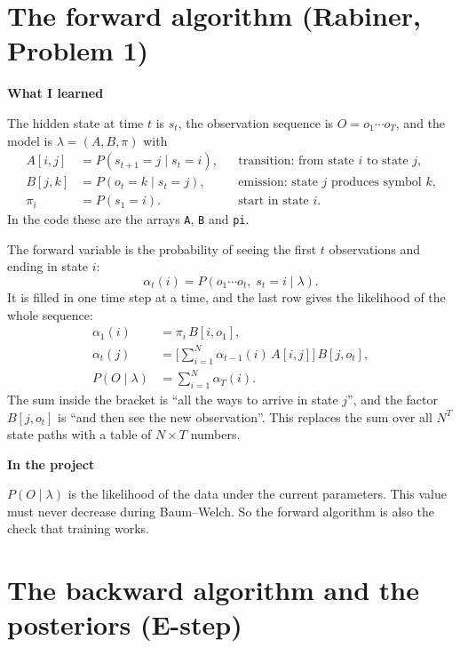 \documentclass[10pt,a4paper]{article}
\newcommand{\sub}[1]{\vspace{1pt}\textbf{\textcolor{gray!80!black}{#1}}\par}
\begin{document}
\section{The forward algorithm (Rabiner, Problem 1)}

\sub{What I learned}
The hidden state at time $t$ is $s_t$, the observation sequence is $O = o_1 \cdots o_T$, and the model is $\lambda = (A, B, \pi)$ with
\begin{align*}
A[i,j] &= P(s_{t+1} = j \mid s_t = i), && \text{transition: from state $i$ to state $j$,} \\
B[j,k] &= P(o_t = k \mid s_t = j), && \text{emission: state $j$ produces symbol $k$,} \\
\pi_i &= P(s_1 = i). && \text{start in state $i$.}
\end{align*}
In the code these are the arrays \texttt{A}, \texttt{B} and \texttt{pi}.

The forward variable is the probability of seeing the first $t$ observations and ending in state $i$:
\[
\alpha_t(i) = P(o_1 \cdots o_t,\; s_t = i \mid \lambda).
\]
It is filled in one time step at a time, and the last row gives the likelihood of the whole sequence:
\begin{align*}
\alpha_1(i) &= \pi_i\, B[i,o_1], \\
\alpha_t(j) &= \Big[ \sum_{i=1}^{N} \alpha_{t-1}(i)\, A[i,j] \Big]\, B[j,o_t], \\
P(O \mid \lambda) &= \sum_{i=1}^{N} \alpha_T(i).
\end{align*}
The sum inside the bracket is ``all the ways to arrive in state $j$'', and the factor $B[j,o_t]$ is ``and then see the new observation''. This replaces the sum over all $N^T$ state paths with a table of $N \times T$ numbers.

\sub{In the project}
$P(O \mid \lambda)$ is the likelihood of the data under the current parameters. This value must never decrease during Baum--Welch. So the forward algorithm is also the check that training works.

\section{The backward algorithm and the posteriors (E-step)}
\end{document}
